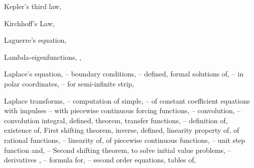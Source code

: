 \begin{theindex}
  \item Kepler's third law, \pageref{exer:6.4.1}

  \item Kirchhoff's Law, \pageref{eq:6.3.5} 

  \item Laguerre's equation, \pageref{eq:7.5.2}

  \item Lambda-eigenfunctions, \pageref{thmtype:11.1.1}, \pageref{example:13.2.1}

  \item Laplace's equation, \pageref{eq:12.3.1}--\pageref{exer:12.4.7}
    \subitem boundary conditions, \pageref{eq:12.3.2}--\pageref{example:12.3.1}
    \subitem defined, \pageref{eq:12.3.2}
    \subitem formal solutions of, \pageref{example:12.3.1}--\pageref{exer:12.3.1}
    \subitem in polar coordinates, \pageref{eq:12.4.1}--\pageref{exer:12.4.7}
    \subitem for semi-infinite strip, \pageref{eq:12.3.24}

  \item Laplace transforms, \pageref{thmtype:8.1.1}--\pageref{exer:8.7.30}
    \subitem computation of simple, \pageref{thmtype:8.1.1}--\pageref{example:8.1.5}
    \subitem of constant coefficient equations
      \subsubitem with impulses \pageref{exer:8.6.14}--\pageref{exer:8.7.30}
      \subsubitem with piecewise continuous forcing functions, \pageref{eq:8.5.1}--\pageref{exer:8.5.26}
    \subitem convolution, \pageref{eq:8.6.1}--\pageref{exer:8.6.14}
      \subsubitem convolution integral, \pageref{example:8.6.5}
      \subsubitem defined, \pageref{thmtype:8.6.1}
      \subsubitem theorem, \pageref{thmtype:8.6.2}
      \subsubitem transfer functions, \pageref{thmtype:8.6.3}--\pageref{exer:8.6.1}
    \subitem definition of, \pageref{thmtype:8.1.1}
    \subitem existence of, \pageref{eq:8.1.12}
    \subitem First shifting theorem, \pageref{thmtype:8.1.3}
    \subitem inverse, \pageref{exer:8.1.18}
      \subsubitem defined, \pageref{exer:8.1.12}
      \subsubitem linearity property of, \pageref{thmtype:8.2.1}
      \subsubitem of rational functions, \pageref{example:8.2.4}--\pageref{exer:8.2.1}
    \subitem linearity of, \pageref{thmtype:8.1.2}
    \subitem of piecewise continuous functions, \pageref{eq:8.4.4}--\pageref{exer:8.4.36}
      \subsubitem unit step function and, \pageref{example:8.4.1}--\pageref{exer:8.4.36}
    \subitem Second shifting theorem, \pageref{thmtype:8.4.2}
    \subitem to solve initial value problems, \pageref{thmtype:8.3.1}--\pageref{exer:8.3.38}
      \subsubitem derivatives , \pageref{thmtype:8.3.1}--\pageref{eq:8.3.5}
      \subsubitem formula for, \pageref{example:8.6.2}--\pageref{eq:8.6.10}
      \subsubitem second order equations, \pageref{example:8.3.2}
    \subitem tables of, \pageref{example:8.1.5}


\end{theindex}
